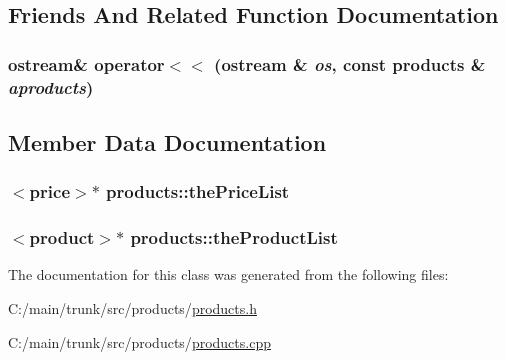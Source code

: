 \subsection{Friends And Related Function Documentation}
\hypertarget{classproducts_aa678af863c41bbd404f7d8eaf3000493}{
\subsubsection[{operator$<$$<$}]{\setlength{\rightskip}{0pt plus 5cm}ostream\& operator$<$$<$ (ostream \& {\em os}, \/  const {\bf products} \& {\em aproducts})}}
\label{classproducts_aa678af863c41bbd404f7d8eaf3000493}


\subsection{Member Data Documentation}
\hypertarget{classproducts_ab1f92b4cbe7296058a19ee473087443f}{
\subsubsection[{thePriceList}]{$<${\bf price}$>$$\ast$ {\bf products::thePriceList}}}
\label{classproducts_ab1f92b4cbe7296058a19ee473087443f}
\hypertarget{classproducts_a5ae92c2c7f494dc1a14e2ecd1543fd74}{
\subsubsection[{theProductList}]{$<${\bf product}$>$$\ast$ {\bf products::theProductList}}}
\label{classproducts_a5ae92c2c7f494dc1a14e2ecd1543fd74}


The documentation for this class was generated from the following files:\begin{DoxyCompactItemize}
\item 
C:/main/trunk/src/products/\hyperlink{products_8h}{products.h}\item 
C:/main/trunk/src/products/\hyperlink{products_8cpp}{products.cpp}\end{DoxyCompactItemize}
